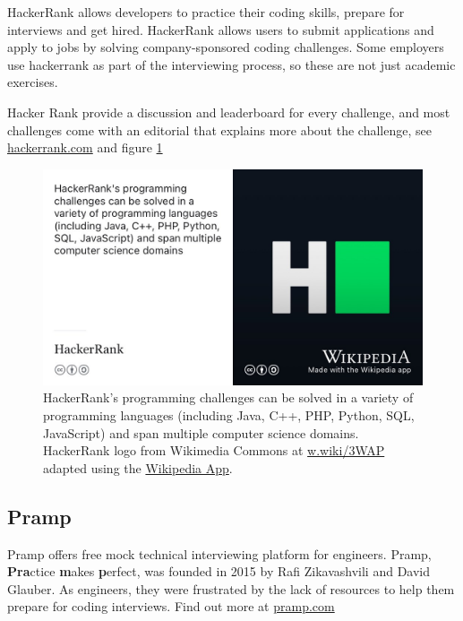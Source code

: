 \documentclass[
]{book}
\begin{document}
HackerRank allows developers to practice their coding skills, prepare for interviews and get hired. HackerRank allows users to submit applications and apply to jobs by solving company-sponsored coding challenges. Some employers use hackerrank as part of the interviewing process, so these are not just academic exercises.

Hacker Rank provide a discussion and leaderboard for every challenge, and most challenges come with an editorial that explains more about the challenge, see \href{https://www.hackerrank.com/}{hackerrank.com} and figure \ref{fig:hackerrank-fig}

\begin{figure}

{\centering \includegraphics[width=0.99\linewidth]{images/hackerrank} 

}

\caption{HackerRank's programming challenges can be solved in a variety of programming languages (including Java, C++, PHP, Python, SQL, JavaScript) and span multiple computer science domains. HackerRank logo from Wikimedia Commons at \href{https://w.wiki/3WAP}{w.wiki/3WAP} adapted using the \href{https://apps.apple.com/us/app/wikipedia/id324715238}{Wikipedia App}.}\label{fig:hackerrank-fig}
\end{figure}



\hypertarget{pramp}{%
\subsection{Pramp}\label{pramp}}

Pramp offers free mock technical interviewing platform for engineers. Pramp, \textbf{Pra}ctice \textbf{m}akes \textbf{p}erfect, was founded in 2015 by Rafi Zikavashvili and David Glauber. As engineers, they were frustrated by the lack of resources to help them prepare for coding interviews. Find out more at \href{https://www.pramp.com}{pramp.com}
\end{document}
